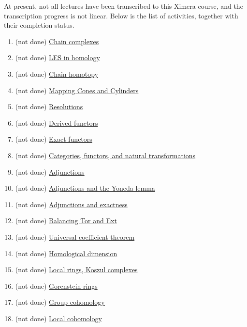 \documentclass{ximera}
\begin{document}
At present, not all lectures have been transcribed to this Ximera
course, and the transcription progress is not linear.  Below is the
list of activities, together with their completion status.

\begin{enumerate}
\item (not done) \href{/activity/chainComplexes/chainComplexes/}{Chain complexes}
\item (not done) \href{/activity/lesInHomology/lesInHomology/}{LES in homology}
\item (not done) \href{/activity/chainHomotopy/chainHomotopy/}{Chain homotopy}
\item (not done) \href{/activity/mappingConesAndCylinders/mappingConesAndCylinders/}{Mapping Cones and Cylinders}
\item (not done) \href{/activity/resolutions/resolutions/}{Resolutions}
\item (not done) \href{/activity/derivedFunctors/derivedFunctors/}{Derived functors}
\item (not done) \href{/activity/exactFunctors/exactFunctors/}{Exact functors}
\item (not done) \href{/activity/categoriesFunctorsAndNaturalTransformations/categoriesFunctorsAndNaturalTransformations/}{Categories, functors, and natural transformations}
\item (not done) \href{/activity/adjunctions/adjunctions/}{Adjunctions}
\item (not done) \href{/activity/adjunctionsAndTheYonedaLemma/adjunctionsAndTheYonedaLemma/}{Adjunctions and the Yoneda lemma}
\item (not done) \href{/activity/adjunctionsAndExactness/adjunctionsAndExactness/}{Adjunctions and exactness}
\item (not done) \href{/activity/balancingTorAndExt/balancingTorAndExt/}{Balancing Tor and Ext}
\item (not done) \href{/activity/universalCoefficientTheorem/universalCoefficientTheorem/}{Universal coefficient theorem}
\item (not done) \href{/activity/homologicalDimension/homologicalDimension/}{Homological dimension}
\item (not done) \href{/activity/localRingsKoszulComplexes/localRingsKoszulComplexes/}{Local rings, Koszul complexes}
\item (not done) \href{/activity/gorensteinRings/gorensteinRings/}{Gorenstein rings}
\item (not done) \href{/activity/groupCohomology/groupCohomology/}{Group cohomology}
\item (not done) \href{/activity/localCohomology/localCohomology/}{Local cohomology}
\end{enumerate}
\end{document}
